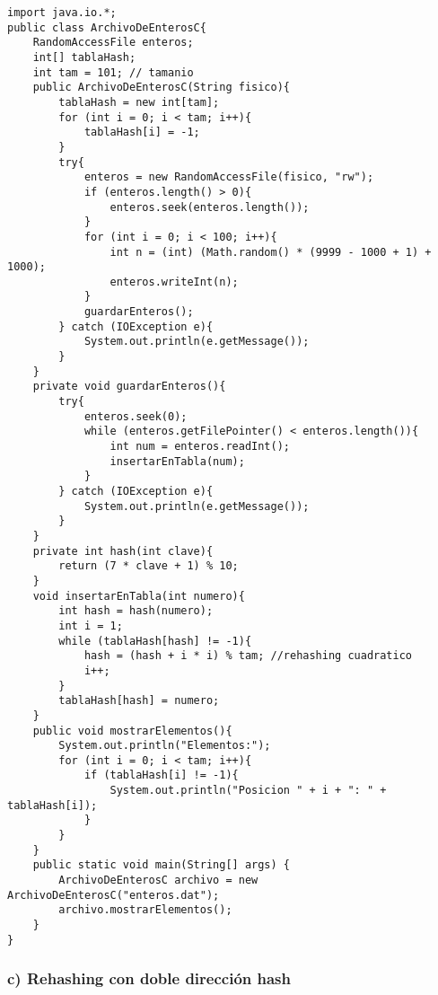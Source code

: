 \documentclass{scrreprt}
\begin{document}
\begin{lstlisting}[style=java]
import java.io.*;
public class ArchivoDeEnterosC{
    RandomAccessFile enteros;
    int[] tablaHash;
    int tam = 101; // tamanio
    public ArchivoDeEnterosC(String fisico){
        tablaHash = new int[tam];
        for (int i = 0; i < tam; i++){
            tablaHash[i] = -1;
        }
        try{
            enteros = new RandomAccessFile(fisico, "rw");
            if (enteros.length() > 0){
                enteros.seek(enteros.length());
            }
            for (int i = 0; i < 100; i++){
                int n = (int) (Math.random() * (9999 - 1000 + 1) + 1000);
                enteros.writeInt(n);
            }
            guardarEnteros();
        } catch (IOException e){
            System.out.println(e.getMessage());
        }
    }
    private void guardarEnteros(){
        try{
            enteros.seek(0);
            while (enteros.getFilePointer() < enteros.length()){
                int num = enteros.readInt();
                insertarEnTabla(num);
            }
        } catch (IOException e){
            System.out.println(e.getMessage());
        }
    }
    private int hash(int clave){
        return (7 * clave + 1) % 10;
    }
    void insertarEnTabla(int numero){
        int hash = hash(numero);
        int i = 1;
        while (tablaHash[hash] != -1){
            hash = (hash + i * i) % tam; //rehashing cuadratico
            i++;
        }
        tablaHash[hash] = numero;
    }
    public void mostrarElementos(){
        System.out.println("Elementos:");
        for (int i = 0; i < tam; i++){
            if (tablaHash[i] != -1){
                System.out.println("Posicion " + i + ": " + tablaHash[i]);
            }
        }
    }
    public static void main(String[] args) {
        ArchivoDeEnterosC archivo = new ArchivoDeEnterosC("enteros.dat");
        archivo.mostrarElementos();
    }
}
\end{lstlisting}
\newpage
\subsubsection{c) Rehashing con doble dirección hash}
\end{document}
